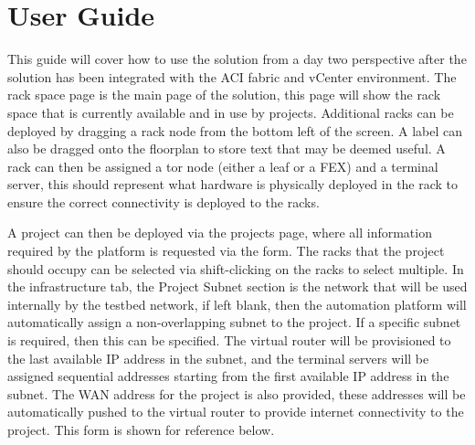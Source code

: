 \chapter{User Guide}
\label{chap:appendix-e}
This guide will cover how to use the solution from a day two perspective after the solution has been integrated with the ACI fabric and vCenter environment.
The rack space page is the main page of the solution, this page will show the rack space that is currently available and in use by projects. Additional racks can be deployed by dragging a rack node from the bottom left of the screen. A label can also be dragged onto the floorplan to store text that may be deemed useful. A rack can then be assigned a \gls{tor} node (either a leaf or a FEX) and a terminal server, this should represent what hardware is physically deployed in the rack to ensure the correct connectivity is deployed to the racks.

A project can then be deployed via the projects page, where all information required by the platform is requested via the form. The racks that the project should occupy can be selected via shift-clicking on the racks to select multiple. In the infrastructure tab, the Project Subnet section is the network that will be used internally by the testbed network, if left blank, then the automation platform will automatically assign a non-overlapping subnet to the project. If a specific subnet is required, then this can be specified. The virtual router will be provisioned to the last available IP address in the subnet, and the terminal servers will be assigned sequential addresses starting from the first available IP address in the subnet. The WAN address for the project is also provided, these addresses will be automatically pushed to the virtual router to provide internet connectivity to the project. This form is shown for reference below.

